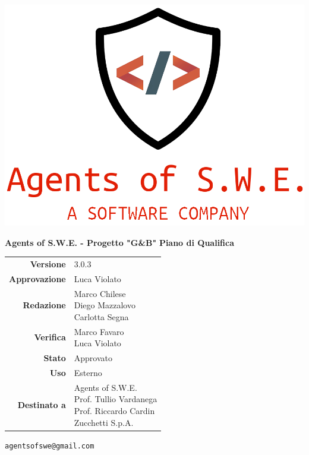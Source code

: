 


\begin{titlepage}
\thispagestyle{empty}

\begin{center}

\includegraphics[scale=0.3]{./images/logo.png} 

\large \textbf{Agents of S.W.E. - Progetto "G\&B"}
\vfill
\Huge \textbf{Piano di Qualifica}
\vfill
\large
\renewcommand{\arraystretch}{1.3}
\begin{tabular}{r|l}
\textbf{Versione} & 3.0.3\\
\textbf{Approvazione} & Luca Violato\\
\textbf{Redazione} & \parbox[t]{5cm}{Marco Chilese\\Diego Mazzalovo\\Carlotta Segna}\\
\textbf{Verifica} & \parbox[t]{5cm}{Marco Favaro\\Luca Violato}\\
\textbf{Stato} & Approvato\\
\textbf{Uso} & Esterno\\
\textbf{Destinato a} & \parbox[t]{5cm}{Agents of S.W.E. \\Prof. Tullio Vardanega\\Prof. Riccardo Cardin\\Zucchetti S.p.A.}
\end{tabular}
\vfill
\small
\texttt{agentsofswe@gmail.com}
\end{center}
\end{titlepage}

